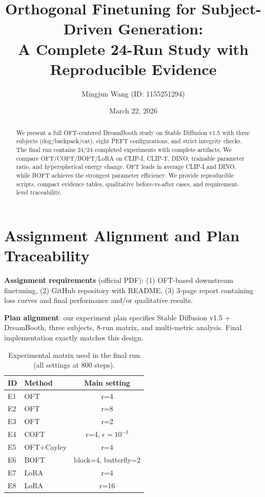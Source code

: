 \documentclass[10pt,twocolumn]{article}
\title{Orthogonal Finetuning for Subject-Driven Generation:\\
\large A Complete 24-Run Study with Reproducible Evidence}
\author{Mingjun Wang (ID: 1155251294)}
\date{March 22, 2026}
\begin{document}
\maketitle
\vspace{-1.5em}

\begin{abstract}
We present a full OFT-centered DreamBooth study on Stable Diffusion v1.5 with three subjects (dog/backpack/cat), eight PEFT configurations, and strict integrity checks. The final run contains 24/24 completed experiments with complete artifacts. We compare OFT/COFT/BOFT/LoRA on CLIP-I, CLIP-T, DINO, trainable parameter ratio, and hyperspherical energy change. OFT leads in average CLIP-I and DINO, while BOFT achieves the strongest parameter efficiency. We provide reproducible scripts, compact evidence tables, qualitative before-vs-after cases, and requirement-level traceability.
\end{abstract}

\section{Assignment Alignment and Plan Traceability}
\textbf{Assignment requirements} (official PDF):
(1) OFT-based downstream finetuning, (2) GitHub repository with README,
(3) 3-page report containing loss curves and final performance and/or qualitative results.

\textbf{Plan alignment}: our experiment plan specifies Stable Diffusion v1.5 + DreamBooth, three subjects, 8-run matrix, and multi-metric analysis. Final implementation exactly matches this design.

\begin{table}[t]
\centering
\caption{Experimental matrix used in the final run (all settings at 800 steps).}
\begin{tabular}{@{}llc@{}}
\toprule
ID & Method & Main setting \\
\midrule
E1 & OFT & r=4 \\
E2 & OFT & r=8 \\
E3 & OFT & r=2 \\
E4 & COFT & r=4, $\epsilon=10^{-3}$ \\
E5 & OFT+Cayley & r=4 \\
E6 & BOFT & block=4, butterfly=2 \\
E7 & LoRA & r=4 \\
E8 & LoRA & r=16 \\
\bottomrule
\end{tabular}
\end{table}
\end{document}
